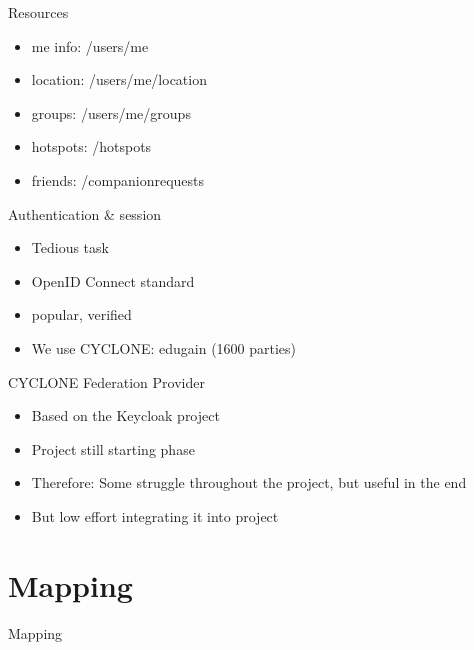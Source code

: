 \documentclass[11pt]{beamer}
\begin{document}
\begin{frame}{Resources}

  \begin{itemize}
    \item me info: /users/me
    \item location: /users/me/location
    \item groups: /users/me/groups
    \item hotspots: /hotspots
    \item friends: /companionrequests
  \end{itemize}

\end{frame}


\begin{frame}{Authentication \& session}

  \begin{itemize}
    \item Tedious task
    \item OpenID Connect standard
    \item popular, verified
    \item We use CYCLONE: edugain (1600 parties)
  \end{itemize}

\end{frame}


\begin{frame}{CYCLONE Federation Provider}

  \begin{itemize}

    \item Based on the Keycloak project
    \item Project still starting phase
    \item Therefore: Some struggle throughout the project, but useful in the end
    \item But low effort integrating it into project

  \end{itemize}

\end{frame}


\section{Mapping}

\begin{frame}{}

  \begin{center}

    {\Huge Mapping}

  \end{center}

\end{frame}
\end{document}
